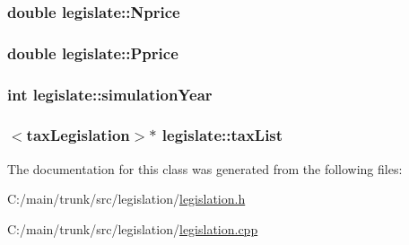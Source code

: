 \label{classlegislate_ade274de9eef9fb1531405290cf95a293}
\hypertarget{classlegislate_aaff56136764eb06a5e710025a13f4a63}{
\subsubsection[{Nprice}]{\setlength{\rightskip}{0pt plus 5cm}double {\bf legislate::Nprice}}}
\label{classlegislate_aaff56136764eb06a5e710025a13f4a63}
\hypertarget{classlegislate_a87333630df0b33be69eec765cd1136e9}{
\subsubsection[{Pprice}]{\setlength{\rightskip}{0pt plus 5cm}double {\bf legislate::Pprice}}}
\label{classlegislate_a87333630df0b33be69eec765cd1136e9}
\hypertarget{classlegislate_afcb6a9247a41a1ebbe825d5046a59910}{
\subsubsection[{simulationYear}]{\setlength{\rightskip}{0pt plus 5cm}int {\bf legislate::simulationYear}}}
\label{classlegislate_afcb6a9247a41a1ebbe825d5046a59910}
\hypertarget{classlegislate_a8c46861a853dc95e9bb2ba62270e12ff}{
\subsubsection[{taxList}]{$<${\bf taxLegislation}$>$$\ast$ {\bf legislate::taxList}}}
\label{classlegislate_a8c46861a853dc95e9bb2ba62270e12ff}


The documentation for this class was generated from the following files:\begin{DoxyCompactItemize}
\item 
C:/main/trunk/src/legislation/\hyperlink{legislation_8h}{legislation.h}\item 
C:/main/trunk/src/legislation/\hyperlink{legislation_8cpp}{legislation.cpp}\end{DoxyCompactItemize}
